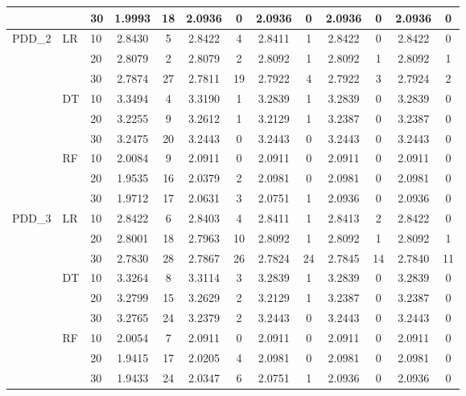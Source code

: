 \begin{table}[h]
\begin{tabular}{ll lcccccccccc}
     &  & 30 & 1.9993 & 18 & 2.0936 & 0 & 2.0936 & 0 & 2.0936 & 0 & 2.0936 & 0 \\
    \midrule
    PDD\_2 & LR & 10 & 2.8430 & 5 & 2.8422 & 4 & 2.8411 & 1 & 2.8422 & 0 & 2.8422 & 0 \\
     &  & 20 & 2.8079 & 2 & 2.8079 & 2 & 2.8092 & 1 & 2.8092 & 1 & 2.8092 & 1 \\
     &  & 30 & 2.7874 & 27 & 2.7811 & 19 & 2.7922 & 4 & 2.7922 & 3 & 2.7924 & 2 \\
     & DT & 10 & 3.3494 & 4 & 3.3190 & 1 & 3.2839 & 1 & 3.2839 & 0 & 3.2839 & 0 \\
     &  & 20 & 3.2255 & 9 & 3.2612 & 1 & 3.2129 & 1 & 3.2387 & 0 & 3.2387 & 0 \\
     &  & 30 & 3.2475 & 20 & 3.2443 & 0 & 3.2443 & 0 & 3.2443 & 0 & 3.2443 & 0 \\
     & RF & 10 & 2.0084 & 9 & 2.0911 & 0 & 2.0911 & 0 & 2.0911 & 0 & 2.0911 & 0 \\
     &  & 20 & 1.9535 & 16 & 2.0379 & 2 & 2.0981 & 0 & 2.0981 & 0 & 2.0981 & 0 \\
     &  & 30 & 1.9712 & 17 & 2.0631 & 3 & 2.0751 & 1 & 2.0936 & 0 & 2.0936 & 0 \\
    \midrule
    PDD\_3 & LR & 10 & 2.8422 & 6 & 2.8403 & 4 & 2.8411 & 1 & 2.8413 & 2 & 2.8422 & 0 \\
     &  & 20 & 2.8001 & 18 & 2.7963 & 10 & 2.8092 & 1 & 2.8092 & 1 & 2.8092 & 1 \\
     &  & 30 & 2.7830 & 28 & 2.7867 & 26 & 2.7824 & 24 & 2.7845 & 14 & 2.7840 & 11 \\
     & DT & 10 & 3.3264 & 8 & 3.3114 & 3 & 3.2839 & 1 & 3.2839 & 0 & 3.2839 & 0 \\
     &  & 20 & 3.2799 & 15 & 3.2629 & 2 & 3.2129 & 1 & 3.2387 & 0 & 3.2387 & 0 \\
     &  & 30 & 3.2765 & 24 & 3.2379 & 2 & 3.2443 & 0 & 3.2443 & 0 & 3.2443 & 0 \\
     & RF & 10 & 2.0054 & 7 & 2.0911 & 0 & 2.0911 & 0 & 2.0911 & 0 & 2.0911 & 0 \\
     &  & 20 & 1.9415 & 17 & 2.0205 & 4 & 2.0981 & 0 & 2.0981 & 0 & 2.0981 & 0 \\
     &  & 30 & 1.9433 & 24 & 2.0347 & 6 & 2.0751 & 1 & 2.0936 & 0 & 2.0936 & 0 \\
    \bottomrule
    \end{tabular}
\end{table}

